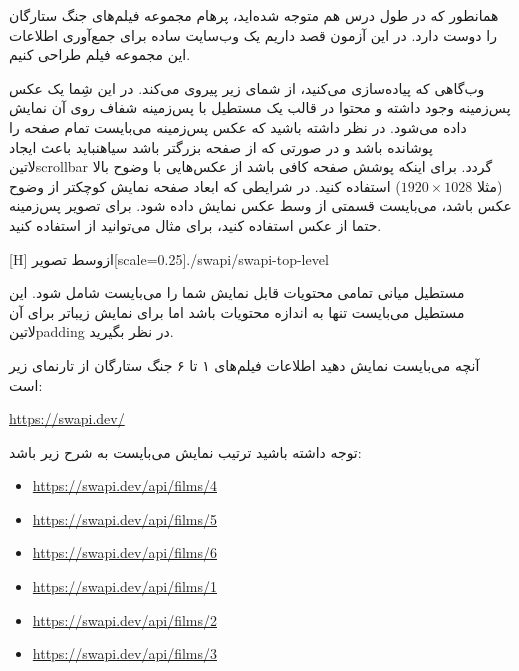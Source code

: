 
همانطور که در طول درس هم متوجه شده‌اید، پرهام مجموعه فیلم‌های جنگ ستارگان را دوست دارد.
در این آزمون قصد داریم یک وب‌سایت ساده برای جمع‌آوری اطلاعات این مجموعه فیلم طراحی کنیم.

وب‌گاهی که پیاده‌سازی می‌کنید، از شمای زیر پیروی می‌کند. در این شِما یک عکس پس‌زمینه وجود داشته و محتوا در قالب یک مستطیل با پس‌زمینه شفاف روی آن نمایش داده می‌شود.
در نظر داشته باشید که عکس پس‌زمینه می‌بایست تمام صفحه را پوشانده باشد و در صورتی که از صفحه بزرگتر باشد ‌سیاه{نباید} باعث ایجاد ‌لاتین{scrollbar} گردد.
برای اینکه پوشش صفحه کافی باشد از عکس‌هایی با وضوح بالا (مثلا $1920 \times 1028$) استفاده کنید.
در شرایطی که ابعاد صفحه نمایش کوچکتر از وضوح عکس باشد، می‌بایست قسمتی از وسط عکس نمایش داده شود.
برای تصویر پس‌زمینه حتما از عکس استفاده کنید، برای مثال می‌توانید از  استفاده کنید.

[H]
  ‌ازوسط
  ‌تصویر[scale=0.25]{./swapi/swapi-top-level}

مستطیل میانی تمامی محتویات قابل نمایش شما را می‌بایست شامل شود. این مستطیل می‌بایست تنها به اندازه محتویات باشد اما
برای نمایش زیباتر برای آن ‌لاتین{padding} در نظر بگیرید.


آنچه می‌بایست نمایش دهید اطلاعات فیلم‌های ۱ تا ۶ جنگ ستارگان از تارنمای زیر است:

\begin{latin}
  \url{https://swapi.dev/}
\end{latin}

توجه داشته باشید ترتیب نمایش می‌بایست به شرح زیر باشد:

\begin{latin}\begin{itemize}
  \item \url{https://swapi.dev/api/films/4}
  \item \url{https://swapi.dev/api/films/5}
  \item \url{https://swapi.dev/api/films/6}
  \item \url{https://swapi.dev/api/films/1}
  \item \url{https://swapi.dev/api/films/2}
  \item \url{https://swapi.dev/api/films/3}
\end{itemize}\end{latin}

